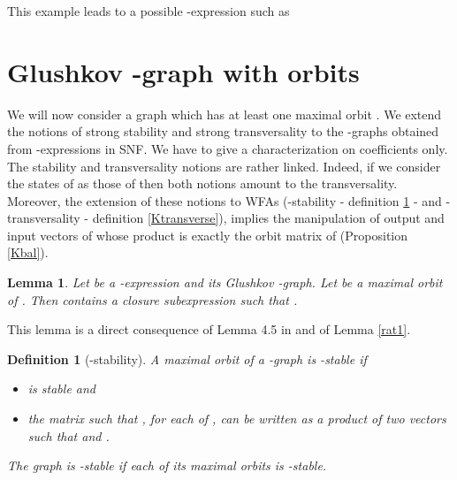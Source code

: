 \documentclass[11pt]{article}
\newtheorem{definition}[theorem]{Definition}
\newtheorem{lemma}[theorem]{Lemma}
\begin{document}


\bigskip

\noindent
This example leads to a possible -expression such as 



\section{Glushkov -graph with orbits}

We will now consider a graph which has at least one maximal orbit . We extend the notions of strong stability and strong transversality to the -graphs obtained from -expressions in SNF.
We have to give a characterization on coefficients only. 
The stability and transversality notions are rather linked. Indeed, if we consider the states of  as those of  then both notions amount to the transversality. Moreover, the extension of these notions to WFAs (-stability - definition \ref{Kstable} - and -transversality - definition \ref{Ktransverse}), implies the manipulation of output and input vectors of  whose product is exactly the orbit matrix of  (Proposition \ref{Kbal}). 

\begin{lemma}\label{orbit=star}
Let  be a -expression and  its Glushkov -graph. Let  be a maximal orbit of . Then  contains a closure subexpression  such that .
\end{lemma}  
This lemma is a direct consequence of Lemma 4.5 in \cite{CZ97} and of Lemma \ref{rat1}.
\begin{definition}[-stability]\label{Kstable}
A maximal orbit  of a -graph  is -stable if 
\begin{itemize} 
\item  is stable and
\item the matrix  such that
, for each  of ,  can be written
as a product  of two vectors such that  and .
\end{itemize}
The graph  is -stable if each of its maximal orbits is -stable.
\end{definition}
\end{document}
